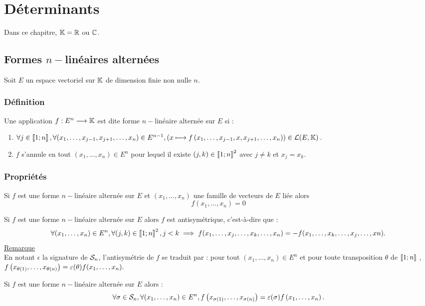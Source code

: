 \chapter{Déterminants}

\minitoc

Dans ce chapitre, \(\K = \R\) ou \(\C\).
\section{Formes \(n-\)linéaires alternées}
Soit \(E\) un espace vectoriel sur \(\K\) de dimension finie non nulle \(n\).
\subsection{Définition}
\begin{defi}
    Une application \(f : E^n \to \K\) est dite forme \(n-\)linéaire alternée sur \(E\) si :
    \begin{enumerate}
        \item \(\forall j \in  \interventierii{1}{n} , \forall  (x_1, \dots  , x_{j-1}, x_{j+1}, \dots  , x_n) \in  E^{n-1}, (x \mapsto f \paren{x_1, \dots  , x_{j-1}, x, x_{j+1}, \dots  , x_n}) \in  \cal{L} (E, \K)\).
        \item \(f\) s’annule en tout \((x_1, \dots  , x_n) \in  E^n\) pour lequel il existe \((j, k) \in  \interventierii{1}{n}^2 \) avec \(j\neq k\) et \(x_j = x_k\).
    \end{enumerate}
\end{defi}

\subsection{Propriétés}
\begin{defprop}
    Si \(f\) est une forme \(n-\)linéaire  alternée sur \(E\) et \((x_1, \dots  , x_n)\) une famille de vecteurs de \(E\) liée alors \[f (x_1, \dots  , x_n) = 0\]
\end{defprop}
\begin{defprop}[Antisymétrie]
    Si \(f\) est une forme \(n-\)linéaire  alternée sur \(E\) alors \(f\) est antisymétrique, c’est-à-dire que :
    \[\forall  (x_1, \dots  , x_n) \in  E^n, \forall  (j, k) \in  \interventierii{1}{n}^2, j < k \imp f (x_1, \dots  , x_j , \dots  , x_k, \dots  , x_n) = -f (x_1, \dots  , x_k, \dots  , x_j , \dots  , xn) .\]
    \underline{Remarque}\\
    En notant \(\epsilon\)  la signature de \(\cal{S}_n\), l’antisymétrie de \(f\) se traduit par : pour tout \((x_1, \dots  , x_n) \in  E^n\) et pour toute transposition \(\theta\) de \(\interventierii{1}{n}\) , \(f\paren{x_{\theta (1)}, \dots  , x_{\theta (n)}} = \epsilon (\theta )f (x_1, \dots  , x_n) .\)
\end{defprop}
\begin{defprop}
    Si \(f\) est une forme \(n-\)linéaire  alternée sur \(E\) alors :
    \[\forall \sigma  \in  \cal{S}_n, \forall  (x_1, \dots  , x_n) \in  E^n, f \paren{ x_{\sigma (1)}, \dots  , x_{\sigma (n)}} = \epsilon (\sigma )f \paren{x_1, \dots  , x_n} .\]
\end{defprop}

